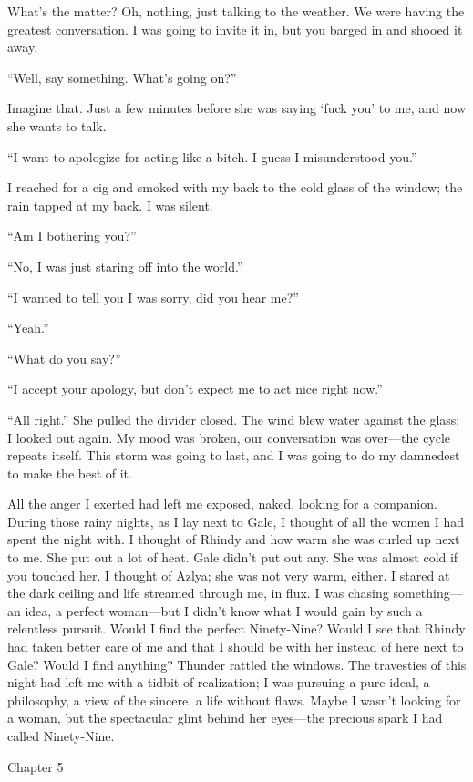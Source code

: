 What's the matter? Oh, nothing, just talking to the weather. We were
having the greatest conversation. I was going to invite it in, but you
barged in and shooed it away.

``Well, say something. What's going on?''

Imagine that. Just a few minutes before she was saying `fuck you' to me,
and now she wants to talk.

``I want to apologize for acting like a bitch. I guess I misunderstood
you.''

I reached for a cig and smoked with my back to the cold glass of the
window; the rain tapped at my back. I was silent.

``Am I bothering you?''

``No, I was just staring off into the world.''

``I wanted to tell you I was sorry, did you hear me?''

``Yeah.''

``What do you say?''

``I accept your apology, but don't expect me to act nice right now.''

``All right.'' She pulled the divider closed. The wind blew water
against the glass; I looked out again. My mood was broken, our
conversation was over---the cycle repeats itself. This storm was going
to last, and I was going to do my damnedest to make the best of it.

All the anger I exerted had left me exposed, naked, looking for a
companion. During those rainy nights, as I lay next to Gale, I thought
of all the women I had spent the night with. I thought of Rhindy and how
warm she was curled up next to me. She put out a lot of heat. Gale
didn't put out any. She was almost cold if you touched her. I thought of
Azlya; she was not very warm, either. I stared at the dark ceiling and
life streamed through me, in flux. I was chasing something---an idea, a
perfect woman---but I didn't know what I would gain by such a relentless
pursuit. Would I find the perfect Ninety-Nine? Would I see that Rhindy
had taken better care of me and that I should be with her instead of
here next to Gale? Would I find anything? Thunder rattled the windows.
The travesties of this night had left me with a tidbit of realization; I
was pursuing a pure ideal, a philosophy, a view of the sincere, a life
without flaws. Maybe I wasn't looking for a woman, but the spectacular
glint behind her eyes---the precious spark I had called Ninety-Nine.

Chapter 5

